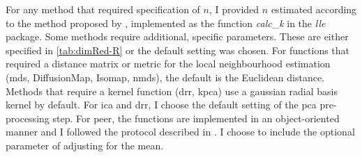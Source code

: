 For any method that required specification of \(n\), I provided \(n\) estimated according to the method proposed by \citet{Kayo2006}, implemented as the function \textit{calc}\_\textit{k} in the \textit{lle} package. Some methods require additional, specific parameters. These are either specified in \cref{tab:dimRed-R} or the default setting was chosen. For functions that required a distance matrix or metric for the local neighbourhood estimation (\gls{mds}, DiffusionMap, Isomap, \gls{nmds}), the default is the Euclidean distance. Methods that require a kernel function (\gls{drr}, \gls{kpca}) use a gaussian radial basis kernel by default. For \gls{ica} and \gls{drr}, I choose the default setting of the \gls{pca} pre-processing step. For \gls{peer}, the functions are implemented in an object-oriented manner and I followed the protocol described in \citet{Stegle2012}. I choose to include the optional parameter of adjusting for the mean.  
%
